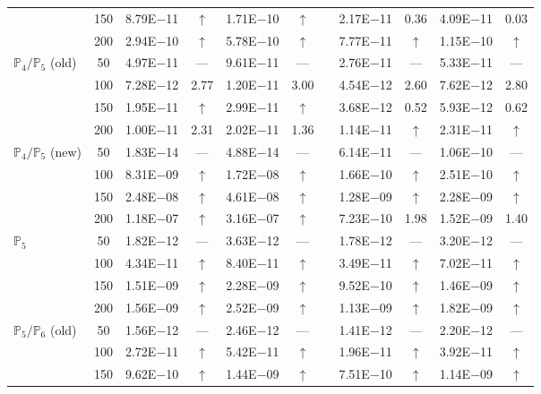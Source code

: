 \begin{table}[H]
{\begin{tabular}{@{}l c c c c c c c c c c@{}}
 & 150 & 8.79E$-$11 & $\uparrow$  & 1.71E$-$10 & $\uparrow$ &  & 2.17E$-$11 & 0.36 & 4.09E$-$11 & 0.03\\
 & 200 & 2.94E$-$10 & $\uparrow$  & 5.78E$-$10 & $\uparrow$ &  & 7.77E$-$11 & $\uparrow$ & 1.15E$-$10 & $\uparrow$\\
\midrule
\multirow{4}{*}{$\mathbb{P}_{4}/\mathbb{P}_{5}$ (old)}
 & 50 & 4.97E$-$11 & ---  & 9.61E$-$11 & --- &  & 2.76E$-$11 & --- & 5.33E$-$11 & ---\\
 & 100 & 7.28E$-$12 & 2.77  & 1.20E$-$11 & 3.00 &  & 4.54E$-$12 & 2.60 & 7.62E$-$12 & 2.80\\
 & 150 & 1.95E$-$11 & $\uparrow$  & 2.99E$-$11 & $\uparrow$ &  & 3.68E$-$12 & 0.52 & 5.93E$-$12 & 0.62\\
 & 200 & 1.00E$-$11 & 2.31  & 2.02E$-$11 & 1.36 &  & 1.14E$-$11 & $\uparrow$ & 2.31E$-$11 & $\uparrow$\\
\midrule
\multirow{4}{*}{$\mathbb{P}_{4}/\mathbb{P}_{5}$ (new)}
 & 50 & 1.83E$-$14 & ---  & 4.88E$-$14 & --- &  & 6.14E$-$11 & --- & 1.06E$-$10 & ---\\
 & 100 & 8.31E$-$09 & $\uparrow$  & 1.72E$-$08 & $\uparrow$ &  & 1.66E$-$10 & $\uparrow$ & 2.51E$-$10 & $\uparrow$\\
 & 150 & 2.48E$-$08 & $\uparrow$  & 4.61E$-$08 & $\uparrow$ &  & 1.28E$-$09 & $\uparrow$ & 2.28E$-$09 & $\uparrow$\\
 & 200 & 1.18E$-$07 & $\uparrow$  & 3.16E$-$07 & $\uparrow$ &  & 7.23E$-$10 & 1.98 & 1.52E$-$09 & 1.40\\
\midrule
\multirow{4}{*}{$\mathbb{P}_{5}$}
 & 50 & 1.82E$-$12 & ---  & 3.63E$-$12 & --- &  & 1.78E$-$12 & --- & 3.20E$-$12 & ---\\
 & 100 & 4.34E$-$11 & $\uparrow$  & 8.40E$-$11 & $\uparrow$ &  & 3.49E$-$11 & $\uparrow$ & 7.02E$-$11 & $\uparrow$\\
 & 150 & 1.51E$-$09 & $\uparrow$  & 2.28E$-$09 & $\uparrow$ &  & 9.52E$-$10 & $\uparrow$ & 1.46E$-$09 & $\uparrow$\\
 & 200 & 1.56E$-$09 & $\uparrow$  & 2.52E$-$09 & $\uparrow$ &  & 1.13E$-$09 & $\uparrow$ & 1.82E$-$09 & $\uparrow$\\
\midrule
\multirow{4}{*}{$\mathbb{P}_{5}/\mathbb{P}_{6}$ (old)}
 & 50 & 1.56E$-$12 & ---  & 2.46E$-$12 & --- &  & 1.41E$-$12 & --- & 2.20E$-$12 & ---\\
 & 100 & 2.72E$-$11 & $\uparrow$  & 5.42E$-$11 & $\uparrow$ &  & 1.96E$-$11 & $\uparrow$ & 3.92E$-$11 & $\uparrow$\\
 & 150 & 9.62E$-$10 & $\uparrow$  & 1.44E$-$09 & $\uparrow$ &  & 7.51E$-$10 & $\uparrow$ & 1.14E$-$09 & $\uparrow$\\

\end{tabular}}
\end{table}
